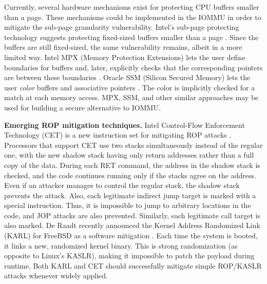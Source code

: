 Currently, several hardware mechanisms exist for protecting CPU buffers smaller than a page. These mechanisms could be implemented in the IOMMU in order to mitigate the sub-page granularity vulnerability. Intel’s sub-page protecting technology suggests protecting fixed-sized buffers smaller than a page \cite{Int18}. Since the buffers are still fixed-sized, the same vulnerability remains, albeit in a more limited way. Intel MPX (Memory Protection Extensions) lets the user define boundaries for buffers and, later, explicitly checks that the corresponding pointers are between these boundaries \cite{Int16a}. Oracle SSM (Silicon Secured Memory) lets the user \emph{color} buffers and associative pointers \cite{Ora15}. The color is implicitly checked for a match at each memory access. MPX, SSM, and other similar approaches may be used for building a secure alternative to IOMMU. 

\smallskip
\noindent\textbf{Emerging ROP mitigation techniques.}
Intel Control-Flow Enforcement Technology (CET) is a new instruction set for mitigating ROP attacks \cite{Int17}. Processors that support CET use two stacks simultaneously instead of the regular one, with the new shadow stack having only return addresses rather than a full copy of the data. During each RET command, the address in the shadow stack is checked, and the code continues running only if the stacks agree on the address. Even if an attacker manages to control the regular stack, the shadow stack prevents the attack. Also, each legitimate indirect jump target is marked with a special instruction. Thus, it is impossible to jump to arbitrary locations in the code, and JOP attacks are also prevented. Similarly, each legitimate call target is also marked. De Raadt recently announced the Kernel Address Randomized Link (KARL) for FreeBSD as a software mitigation \cite{dr17}. Each time the system is booted, it links a new, randomized kernel binary. This is strong randomization (as opposite to Linux’s KASLR), making it impossible to patch the payload during runtime. Both KARL and CET should successfully mitigate simple ROP/KASLR attacks whenever widely applied.